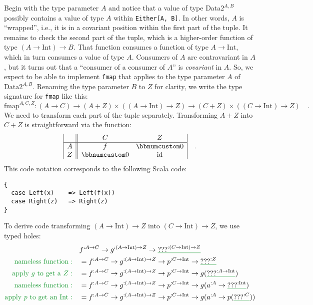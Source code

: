 Begin with the type parameter $A$ and notice that a value of type
$\text{Data2}^{A,B}$ possibly contains a value of type $A$ within
\lstinline!Either[A, B]!. In other words, $A$ is \textsf{``}wrapped\textsf{''},
i.e., it is in a covariant position within the first part of the tuple.
It remains to check the second part of the tuple, which is a higher-order
function of type $\left(A\rightarrow\text{Int}\right)\rightarrow B$.
That function consumes a function of type $A\rightarrow\text{Int}$,
which in turn consumes a value of type $A$. Consumers of $A$ are
contravariant in $A$, but it turns out that a \textsf{``}consumer of a consumer
of $A$\textsf{''} is \emph{covariant} in $A$. So, we expect to be able to
implement \lstinline!fmap! that applies to the type parameter $A$
of $\text{Data2}^{A,B}$. Renaming the type parameter $B$ to $Z$
for clarity, we write the type signature for \lstinline!fmap! like
this:
\[
\text{fmap}^{A,C,Z}:\left(A\rightarrow C\right)\rightarrow\left(A+Z\right)\times\left(\left(A\rightarrow\text{Int}\right)\rightarrow Z\right)\rightarrow\left(C+Z\right)\times\left(\left(C\rightarrow\text{Int}\right)\rightarrow Z\right)\quad.
\]
We need to transform each part of the tuple separately. Transforming
$A+Z$ into $C+Z$ is straightforward via the function:
\[
\begin{array}{|c||cc|}
 & C & Z\\
\hline A & f & \bbnum 0\\
Z & \bbnum 0 & \text{id}
\end{array}\quad.
\]
This code notation corresponds to the following Scala code:
\begin{lstlisting}
{
  case Left(x)    => Left(f(x))
  case Right(z)   => Right(z)
}
\end{lstlisting}
To derive code transforming $\left(A\rightarrow\text{Int}\right)\rightarrow Z$
into $\left(C\rightarrow\text{Int}\right)\rightarrow Z$, we use typed
holes:
\begin{align*}
 & f^{:A\rightarrow C}\rightarrow g^{:\left(A\rightarrow\text{Int}\right)\rightarrow Z}\rightarrow\gunderline{\text{???}^{:\left(C\rightarrow\text{Int}\right)\rightarrow Z}}\\
{\color{greenunder}\text{nameless function}:}\quad & =f^{:A\rightarrow C}\rightarrow g^{:\left(A\rightarrow\text{Int}\right)\rightarrow Z}\rightarrow p^{:C\rightarrow\text{Int}}\rightarrow\gunderline{\text{???}^{:Z}}\\
{\color{greenunder}\text{apply }g\text{ to get a }Z:}\quad & =f^{:A\rightarrow C}\rightarrow g^{:\left(A\rightarrow\text{Int}\right)\rightarrow Z}\rightarrow p^{:C\rightarrow\text{Int}}\rightarrow g(\gunderline{\text{???}^{:A\rightarrow\text{Int}}})\\
{\color{greenunder}\text{nameless function}:}\quad & =f^{:A\rightarrow C}\rightarrow g^{:\left(A\rightarrow\text{Int}\right)\rightarrow Z}\rightarrow p^{:C\rightarrow\text{Int}}\rightarrow g(a^{:A}\rightarrow\gunderline{\text{???}^{:\text{Int}}})\\
{\color{greenunder}\text{apply }p\text{ to get an Int}:}\quad & =f^{:A\rightarrow C}\rightarrow g^{:\left(A\rightarrow\text{Int}\right)\rightarrow Z}\rightarrow p^{:C\rightarrow\text{Int}}\rightarrow g(a^{:A}\rightarrow p(\gunderline{\text{???}^{:C}}))
\end{align*}
